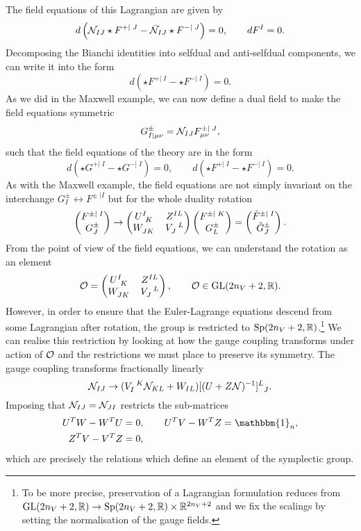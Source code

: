 The field equations of this Lagrangian are given by
\begin{equation*}
	d \left( {\cal N}_{IJ} \star F^{+ | \; J} - \bar{{\cal N}}_{IJ} \star F^{- | \; J} \right) = 0, \qquad d F^I = 0.
\end{equation*}
Decomposing the Bianchi identities into selfdual and anti-selfdual components, we can write it into the form
\begin{equation*}
	d \left( \star F^{+ | \; I} - \star F^{- | \; I} \right) = 0.
\end{equation*}
As we did in the Maxwell example, we can now define a dual field to make the field equations symmetric 
\begin{equation*}
	G^{\pm}_{I | \mu \nu} = {\cal N}_{IJ} F^{\pm | \; J}_{\mu \nu},
\end{equation*}
such that the field equations of the theory are in the form
\begin{equation*}
d \left( \star G^{+ | \; I} - \star G^{- | \; I} \right) = 0	, \qquad d \left( \star F^{+ | \; I} - \star F^{- | \; I} \right) = 0.
\end{equation*}
As with the Maxwell example, the field equations are not simply invariant on the interchange $G^{\pm}_I \leftrightarrow F^{\pm \; |I}$ but for the whole duality rotation \cite{Mohaupt:2000mj}
\begin{equation*}
	\pvec{F^{\pm | \; I} }{G_J^{\pm}} \rightarrow \pmat{\tensor{U}{^I_K}}{\tensor{Z}{^{IL}}}{\tensor{W}{_{JK}}}{\tensor{V}{_J^L}} \pvec{F^{\pm | \; K} }{G_L^{\pm}} = \pvec{\tilde{F}^{\pm | \; I} }{\tilde{G}_J^{\pm}}.
\end{equation*}
From the point of view of the field equations, we can understand the rotation as an element
\begin{equation*}
	\Op = \pmat{\tensor{U}{^I_K}}{\tensor{Z}{^{IL}}}{\tensor{W}{_{JK}}}{\tensor{V}{_J^L}}, \qquad \Op \in \text{GL}(2n_V + 2, \Real).
\end{equation*} 
However, in order to ensure that the Euler-Lagrange equations descend from some Lagrangian after rotation, the group is restricted to $\text{Sp}(2n_V + 2, {\mathbb{R}})$.\footnote{To be more precise, preservation of a Lagrangian formulation reduces from $\text{GL}(2n_V + 2, {\mathbb{R}}) \to \text{Sp}(2n_V + 2, {\mathbb{R}}) \times {\mathbb{R}}^{2n_V + 2}$ and we fix the scalings by setting the normalisation of the gauge fields.} We can realise this restriction by looking at how the gauge coupling transforms under action of ${\cal O}$ and the restrictions we must place to preserve its symmetry. The gauge coupling transforms fractionally linearly \cite{deWit:2001pz}
\begin{equation*}
	\N_{IJ} \to (\tensor{V}{_I^K} \N_{KL} + W_{IL}) \tensor{[(U + Z \N)^{-1}]}{^L_J}.
\end{equation*} 
Imposing that ${\cal N}_{IJ} = {\cal N}_{JI}$ restricts the sub-matrices
\begin{equation*}
	\begin{aligned}
		U^T W- W^T U &= 0, \qquad U^T V - W^T Z = \mathbbm{1}_n, \\
		Z^T V - V^T Z &= 0,
	\end{aligned}
\end{equation*} 
which are precisely the relations which define an element of the symplectic group.

